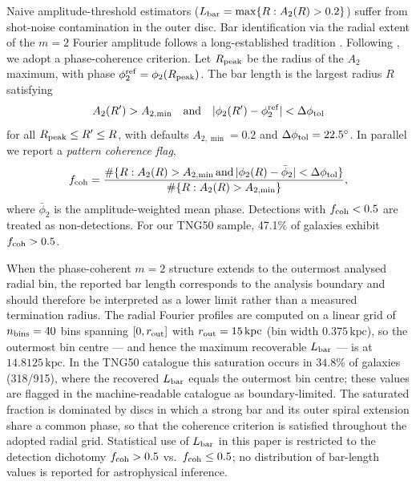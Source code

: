 \documentclass[fleqn,usenatbib]{mnras}
\newcommand{\Am}[1]{A_{#1}}
\newcommand{\kpc}{\,\mathrm{kpc}}
\begin{document}
Naive amplitude-threshold estimators
($L_{\rm bar} = \max\{R : \Am{2}(R) > 0.2\}$) suffer from
shot-noise contamination in the outer disc.  Bar identification via the radial extent of the $m=2$ Fourier amplitude follows a long-established tradition
\citep{1990ApJ...357...71O,2002MNRAS.330...35A,2005MNRAS.364..283E}.
Following \citet{2005A&A...434..109A}, we adopt a phase-coherence
criterion.  Let $R_{\rm peak}$ be the radius of the $\Am{2}$ maximum, with phase $\phi_2^{\rm ref} = \phi_2(R_{\rm peak})$.  The bar length is the
largest radius $R$ satisfying
\begin{equation}
  \Am{2}(R') > \Am{2, \min} \quad \text{and} \quad
  |\phi_2(R') - \phi_2^{\rm ref}| < \Delta\phi_{\rm tol}
  \label{eq:bar_length}
\end{equation}
for all $R_{\rm peak} \le R' \le R$, with defaults
$\Am{2,\min} = 0.2$ and
$\Delta\phi_{\rm tol} = 22.5^{\circ}$.  In parallel we report a
\emph{pattern coherence flag},
\begin{equation}
  f_{\rm coh} = \frac{
    \#\{R : \Am{2}(R) > \Am{2,\min}\,\text{and}\,
    |\phi_2(R) - \bar\phi_2| < \Delta\phi_{\rm tol}\}}{
    \#\{R : \Am{2}(R) > \Am{2,\min}\}},
\end{equation}
where $\bar\phi_2$ is the amplitude-weighted mean phase.  Detections
with $f_{\rm coh} < 0.5$ are treated as non-detections.  For our
TNG50 sample, 47.1\% of galaxies exhibit $f_{\rm coh} > 0.5$.

When the phase-coherent $m=2$ structure extends to the outermost
analysed radial bin, the reported bar length corresponds to the
analysis boundary and should therefore be interpreted as a lower
limit rather than a measured termination radius.  The radial
Fourier profiles are computed on a linear grid of $n_{\rm bins} = 40$
bins spanning $[0, r_{\rm out}]$ with $r_{\rm out} = 15\kpc$
(bin width $0.375\kpc$), so the outermost bin centre --- and hence
the maximum recoverable $L_{\rm bar}$ --- is at $14.8125\kpc$.
In the TNG50 catalogue this saturation occurs in $34.8\%$ of galaxies
(318/915), where the recovered $L_{\rm bar}$ equals the outermost
bin centre; these values are flagged in the machine-readable catalogue
as boundary-limited.  The saturated fraction is dominated by discs in
which a strong bar and its outer spiral extension share a common
phase, so that the coherence criterion is satisfied throughout the
adopted radial grid.  Statistical use of $L_{\rm bar}$ in this paper
is restricted to the detection dichotomy $f_{\rm coh} > 0.5$ vs.\
$f_{\rm coh} \le 0.5$; no distribution of bar-length values is
reported for astrophysical inference.
\end{document}
